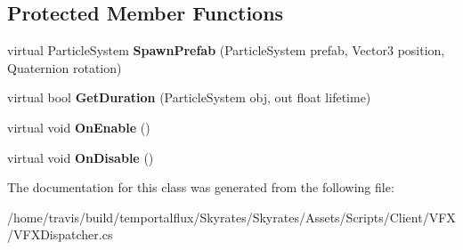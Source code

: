 \subsection*{Protected Member Functions}
\begin{DoxyCompactItemize}
\item 
\hypertarget{class_v_f_x_dispatcher_abf8c1a40efe6fa86892c804b96b6b1e4}{virtual Particle\-System {\bfseries Spawn\-Prefab} (Particle\-System prefab, Vector3 position, Quaternion rotation)}\label{class_v_f_x_dispatcher_abf8c1a40efe6fa86892c804b96b6b1e4}

\item 
\hypertarget{class_v_f_x_dispatcher_a1c00d59e29d0471376f0f606e0f46aeb}{virtual bool {\bfseries Get\-Duration} (Particle\-System obj, out float lifetime)}\label{class_v_f_x_dispatcher_a1c00d59e29d0471376f0f606e0f46aeb}

\item 
\hypertarget{class_v_f_x_dispatcher_a778af6b8d64d106a1bcc22535b3d38d2}{virtual void {\bfseries On\-Enable} ()}\label{class_v_f_x_dispatcher_a778af6b8d64d106a1bcc22535b3d38d2}

\item 
\hypertarget{class_v_f_x_dispatcher_a78ec7de61c63944f0804f64d1b7e983a}{virtual void {\bfseries On\-Disable} ()}\label{class_v_f_x_dispatcher_a78ec7de61c63944f0804f64d1b7e983a}

\end{DoxyCompactItemize}


The documentation for this class was generated from the following file\-:\begin{DoxyCompactItemize}
\item 
/home/travis/build/temportalflux/\-Skyrates/\-Skyrates/\-Assets/\-Scripts/\-Client/\-V\-F\-X/V\-F\-X\-Dispatcher.\-cs\end{DoxyCompactItemize}
